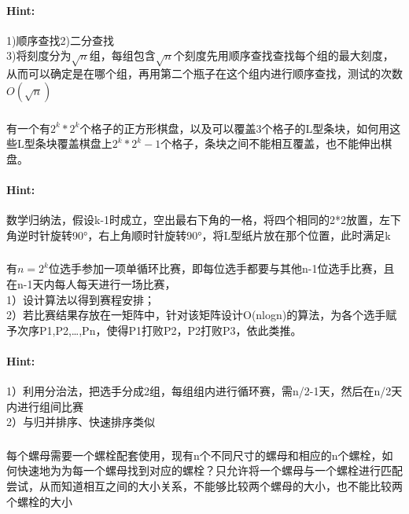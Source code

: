 \documentclass{article}
\begin{document}
     \paragraph{Hint:}1)顺序查找2)二分查找\\
     3)将刻度分为$\sqrt{n}$组，每组包含$\sqrt{n}$个刻度先用顺序查找查找每个组的最大刻度，从而可以确定是在哪个组，再用第二个瓶子在这个组内进行顺序查找，测试的次数$O(\sqrt{n})$
     
     \subsubsection{}有一个有$2^k*2^k$个格子的正方形棋盘，以及可以覆盖3个格子的L型条块，如何用这些L型条块覆盖棋盘上$2^k*2^k-1$个格子，条块之间不能相互覆盖，也不能伸出棋盘。
     \paragraph{Hint:}数学归纳法，假设k-1时成立，空出最右下角的一格，将四个相同的2*2放置，左下角逆时针旋转90°，右上角顺时针旋转90°，将L型纸片放在那个位置，此时满足k\\
     
     \subsubsection{}有$n=2^k$位选手参加一项单循环比赛，即每位选手都要与其他n-1位选手比赛，且在n-1天内每人每天进行一场比赛，\\
     1）设计算法以得到赛程安排；\\
     2）若比赛结果存放在一矩阵中，针对该矩阵设计O(nlogn)的算法，为各个选手赋予次序P1,P2,…,Pn，使得P1打败P2，P2打败P3，依此类推。
     
     \paragraph{Hint:}1）利用分治法，把选手分成2组，每组组内进行循环赛，需n/2-1天，然后在n/2天内进行组间比赛\\
     2）与归并排序、快速排序类似\\

     
      \subsubsection{}每个螺母需要一个螺栓配套使用，现有n个不同尺寸的螺母和相应的n个螺栓，如何快速地为为每一个螺母找到对应的螺栓？只允许将一个螺母与一个螺栓进行匹配尝试，从而知道相互之间的大小关系，不能够比较两个螺母的大小，也不能比较两个螺栓的大小
\end{document}
